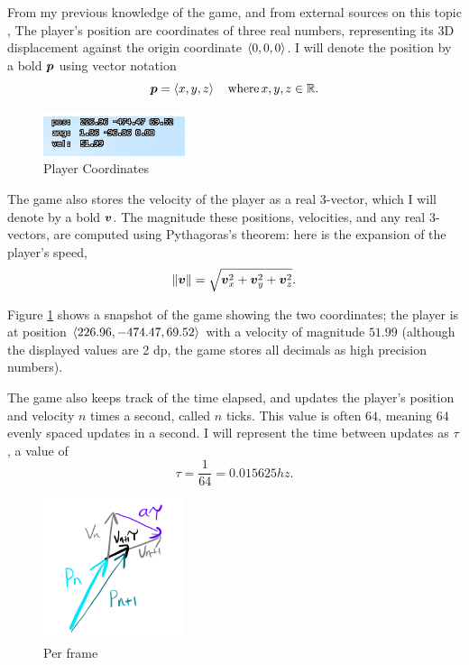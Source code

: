 From my previous knowledge of the game, and from external sources on this topic \parencite{Kered13}, The player's position are coordinates of three real numbers, representing its 3D displacement against the origin coordinate $\left\langle 0,0,0 \right\rangle$. I will denote the position by a bold $\boldsymbol{p}$ using vector notation
\[
    \boldsymbol{p} = \left\langle x, y, z \right\rangle \quad \text{where} \, x, y, z \in  \mathbb{R}.
\]

\begin{figure}
    \includegraphics[width=0.37\textwidth,right]{assets/1coords.png}
    \caption{Player Coordinates}
    \label{fig:1coords}
\end{figure}

The game also stores the velocity of the player as a real 3-vector, which I will denote by a bold $\boldsymbol{v}$. The magnitude these positions, velocities, and any real 3-vectors, are computed using Pythagoras's theorem: here is the expansion of the player's speed,
\[
    \|\boldsymbol{v}\| = \sqrt{\boldsymbol{v}_x^2+\boldsymbol{v}_y^2+\boldsymbol{v}_z^2}.
\]


Figure \ref{fig:1coords} shows a snapshot of the game showing the two coordinates; the player is at position $\left\langle 226.96, -474.47, 69.52 \right\rangle$ with a velocity of magnitude $51.99$ (although the displayed values are 2 dp, the game stores all decimals as high precision numbers).


The game also keeps track of the time elapsed, and updates the player's position and velocity $n$ times a second, called $n$ ticks. This value is often $64$, meaning $64$ evenly spaced updates in a second. I will represent the time between updates as $\tau$, a value of
\[
    \tau = \frac{1}{64} = 0.015625 \si{hz}.
\]

\begin{figure}
    \includegraphics[width=0.37\textwidth,right]{assets/1vecadd.png}
    \caption{Per frame}
    \label{fig:1vecadd}
\end{figure}

